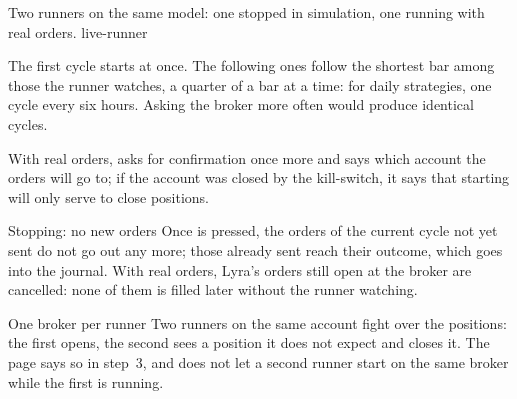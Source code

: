   {Two runners on the same model: one stopped in simulation, one running
   with real orders.}
  {live-runner}

\noindent
The first cycle starts at once. The following ones follow the shortest bar
among those the runner watches, a quarter of a bar at a time: for daily
strategies, one cycle every six hours. Asking the broker more often would
produce identical cycles.

\noindent
With real orders,  asks for confirmation once more and says
which account the orders will go to; if the account was closed by the
kill-switch, it says that starting will only serve to close positions.

\begin{nota}{Stopping: no new orders}
Once  is pressed, the orders of the current cycle not yet sent
do not go out any more; those already sent reach their outcome, which goes
into the journal. With real orders, Lyra's orders still open at the broker
are cancelled: none of them is filled later without the runner watching.
\end{nota}

\begin{attenzione}{One broker per runner}
Two runners on the same account fight over the positions: the first opens,
the second sees a position it does not expect and closes it. The page says
so in step~\num{3}, and does not let a second runner start on the same
broker while the first is running.
\end{attenzione}

\flushbottom
